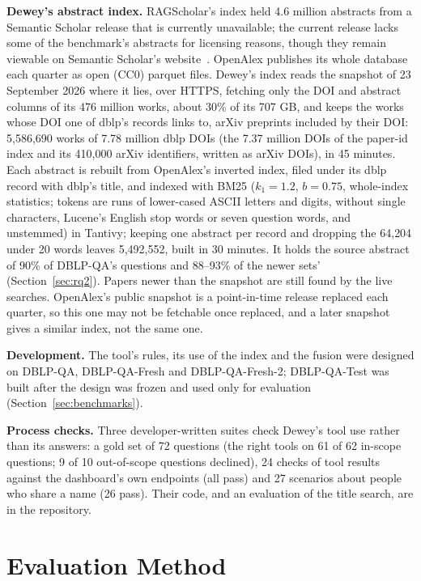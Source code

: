 \documentclass[conference]{IEEEtran}
\newcommand{\dq}{DBLP-QA}
\newcommand{\fresh}{DBLP-QA-Fresh}
\newcommand{\freshb}{DBLP-QA-Fresh-2}
\newcommand{\test}{DBLP-QA-Test}
\begin{document}
\textbf{Dewey's abstract index.} RAGScholar's index held 4.6 million abstracts from a Semantic Scholar
release that is currently unavailable; the current release lacks some of the benchmark's abstracts for
licensing reasons, though they remain viewable on Semantic Scholar's website~\cite{neekhra2026ragscholar}. OpenAlex publishes its whole database each quarter as
open (CC0) parquet files. Dewey's index reads the snapshot of 23 September 2026 where it lies, over
HTTPS, fetching only the DOI and abstract columns of its 476 million works, about 30\% of its 707 GB,
and keeps the works whose DOI one of dblp's records links to, arXiv preprints included by their DOI:
5{,}586{,}690 works of 7.78 million dblp DOIs (the 7.37 million DOIs of the paper-id index and its
410{,}000 arXiv identifiers, written as arXiv DOIs), in 45 minutes. Each abstract is rebuilt from OpenAlex's
inverted index, filed under its dblp record with dblp's title, and indexed with BM25 ($k_1=1.2$,
$b=0.75$, whole-index statistics; tokens are runs of lower-cased ASCII letters and digits, without single
characters, Lucene's English stop words or seven question words, and unstemmed) in Tantivy; keeping one abstract per record
and dropping the 64{,}204 under 20 words leaves 5{,}492{,}552, built in 30 minutes. It holds the source
abstract of 90\% of \dq{}'s questions and 88--93\% of the newer sets' (Section~\ref{sec:rq2}). Papers newer than the snapshot are still found
by the live searches. OpenAlex's public snapshot is a point-in-time release replaced each quarter, so this
one may not be fetchable once replaced, and a later snapshot gives a similar index, not the same one.

\textbf{Development.} The tool's rules, its use of the index and the fusion were designed on \dq{},
\fresh{} and \freshb{}; \test{} was built after the design was frozen and used only for evaluation
(Section~\ref{sec:benchmarks}).

\textbf{Process checks.} Three developer-written suites check Dewey's tool use rather than its answers: a
gold set of 72 questions (the right tools on 61 of 62 in-scope questions; 9 of 10 out-of-scope questions
declined), 24 checks of tool results against the dashboard's own endpoints (all pass) and 27 scenarios
about people who share a name (26 pass). Their code, and an evaluation of the title search, are in the
repository.

\section{Evaluation Method}
\end{document}
